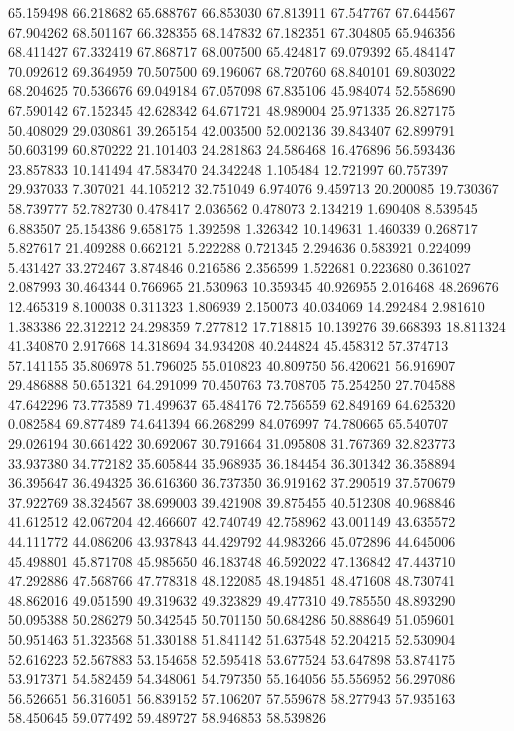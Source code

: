 65.159498
66.218682
65.688767
66.853030
67.813911
67.547767
67.644567
67.904262
68.501167
66.328355
68.147832
67.182351
67.304805
65.946356
68.411427
67.332419
67.868717
68.007500
65.424817
69.079392
65.484147
70.092612
69.364959
70.507500
69.196067
68.720760
68.840101
69.803022
68.204625
70.536676
69.049184
67.057098
67.835106
45.984074
52.558690
67.590142
67.152345
42.628342
64.671721
48.989004
25.971335
26.827175
50.408029
29.030861
39.265154
42.003500
52.002136
39.843407
62.899791
50.603199
60.870222
21.101403
24.281863
24.586468
16.476896
56.593436
23.857833
10.141494
47.583470
24.342248
1.105484
12.721997
60.757397
29.937033
7.307021
44.105212
32.751049
6.974076
9.459713
20.200085
19.730367
58.739777
52.782730
0.478417
2.036562
0.478073
2.134219
1.690408
8.539545
6.883507
25.154386
9.658175
1.392598
1.326342
10.149631
1.460339
0.268717
5.827617
21.409288
0.662121
5.222288
0.721345
2.294636
0.583921
0.224099
5.431427
33.272467
3.874846
0.216586
2.356599
1.522681
0.223680
0.361027
2.087993
30.464344
0.766965
21.530963
10.359345
40.926955
2.016468
48.269676
12.465319
8.100038
0.311323
1.806939
2.150073
40.034069
14.292484
2.981610
1.383386
22.312212
24.298359
7.277812
17.718815
10.139276
39.668393
18.811324
41.340870
2.917668
14.318694
34.934208
40.244824
45.458312
57.374713
57.141155
35.806978
51.796025
55.010823
40.809750
56.420621
56.916907
29.486888
50.651321
64.291099
70.450763
73.708705
75.254250
27.704588
47.642296
73.773589
71.499637
65.484176
72.756559
62.849169
64.625320
0.082584
69.877489
74.641394
66.268299
84.076997
74.780665
65.540707
29.026194
30.661422
30.692067
30.791664
31.095808
31.767369
32.823773
33.937380
34.772182
35.605844
35.968935
36.184454
36.301342
36.358894
36.395647
36.494325
36.616360
36.737350
36.919162
37.290519
37.570679
37.922769
38.324567
38.699003
39.421908
39.875455
40.512308
40.968846
41.612512
42.067204
42.466607
42.740749
42.758962
43.001149
43.635572
44.111772
44.086206
43.937843
44.429792
44.983266
45.072896
44.645006
45.498801
45.871708
45.985650
46.183748
46.592022
47.136842
47.443710
47.292886
47.568766
47.778318
48.122085
48.194851
48.471608
48.730741
48.862016
49.051590
49.319632
49.323829
49.477310
49.785550
48.893290
50.095388
50.286279
50.342545
50.701150
50.684286
50.888649
51.059601
50.951463
51.323568
51.330188
51.841142
51.637548
52.204215
52.530904
52.616223
52.567883
53.154658
52.595418
53.677524
53.647898
53.874175
53.917371
54.582459
54.348061
54.797350
55.164056
55.556952
56.297086
56.526651
56.316051
56.839152
57.106207
57.559678
58.277943
57.935163
58.450645
59.077492
59.489727
58.946853
58.539826
